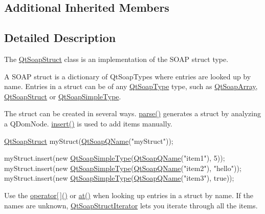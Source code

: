 \subsection*{Additional Inherited Members}


\subsection{Detailed Description}
The \mbox{\hyperlink{class_qt_soap_struct}{Qt\+Soap\+Struct}} class is an implementation of the S\+O\+AP struct type. 

A S\+O\+AP struct is a dictionary of Qt\+Soap\+Types where entries are looked up by name. Entries in a struct can be of any \mbox{\hyperlink{class_qt_soap_type}{Qt\+Soap\+Type}} type, such as \mbox{\hyperlink{class_qt_soap_array}{Qt\+Soap\+Array}}, \mbox{\hyperlink{class_qt_soap_struct}{Qt\+Soap\+Struct}} or \mbox{\hyperlink{class_qt_soap_simple_type}{Qt\+Soap\+Simple\+Type}}.

The struct can be created in several ways. \mbox{\hyperlink{class_qt_soap_struct_a995203c62315d9056d78cfe345b6b106}{parse()}} generates a struct by analyzing a Q\+Dom\+Node. \mbox{\hyperlink{class_qt_soap_struct_aff72b9260ac8a59e856d1faf58b56f21}{insert()}} is used to add items manually.


\begin{DoxyCode}
\mbox{\hyperlink{class_qt_soap_struct}{QtSoapStruct}} myStruct(\mbox{\hyperlink{class_qt_soap_q_name}{QtSoapQName}}(\textcolor{stringliteral}{"myStruct"}));

myStruct.insert(\textcolor{keyword}{new} \mbox{\hyperlink{class_qt_soap_simple_type}{QtSoapSimpleType}}(\mbox{\hyperlink{class_qt_soap_q_name}{QtSoapQName}}(\textcolor{stringliteral}{"item1"}), 5));
myStruct.insert(\textcolor{keyword}{new} \mbox{\hyperlink{class_qt_soap_simple_type}{QtSoapSimpleType}}(\mbox{\hyperlink{class_qt_soap_q_name}{QtSoapQName}}(\textcolor{stringliteral}{"item2"}), \textcolor{stringliteral}{"hello"}));
myStruct.insert(\textcolor{keyword}{new} \mbox{\hyperlink{class_qt_soap_simple_type}{QtSoapSimpleType}}(\mbox{\hyperlink{class_qt_soap_q_name}{QtSoapQName}}(\textcolor{stringliteral}{"item3"}), \textcolor{keyword}{true}));
\end{DoxyCode}


Use the \mbox{\hyperlink{class_qt_soap_struct_a7a17a5c0e57c9a0e1d8256970cebe1fe}{operator\mbox{[}$\,$\mbox{]}()}} or \mbox{\hyperlink{class_qt_soap_struct_a62d5abf450b25ec149779b0ac3e592ef}{at()}} when looking up entries in a struct by name. If the names are unknown, \mbox{\hyperlink{class_qt_soap_struct_iterator}{Qt\+Soap\+Struct\+Iterator}} lets you iterate through all the items.


